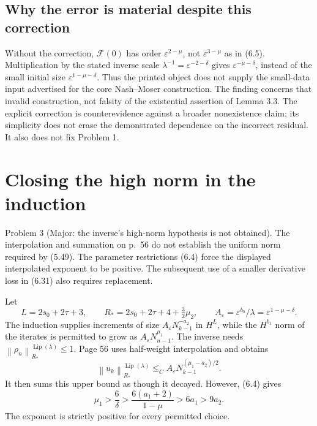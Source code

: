 \documentclass[10pt]{article}
\begin{document}
\subsection*{Why the error is material despite this correction}
Without the correction, \(\mathcal F(0)\) has order \(\varepsilon^{2-\mu}\), not \(\varepsilon^{3-\mu}\) as in (6.5). Multiplication by the stated inverse scale \(\lambda^{-1}=\varepsilon^{-2-\delta}\) gives \(\varepsilon^{-\mu-\delta}\), instead of the small initial size \(\varepsilon^{1-\mu-\delta}\). Thus the printed object does not supply the small-data input advertised for the core Nash–Moser construction. The finding concerns that invalid construction, not falsity of the existential assertion of Lemma 3.3. The explicit correction is counterevidence against a broader nonexistence claim; its simplicity does not erase the demonstrated dependence on the incorrect residual. It also does not fix Problem 1.\par
\section*{Closing the high norm in the induction}
Problem 3 (Major: the inverse’s high-norm hypothesis is not obtained).  The interpolation and summation on p. 56 do not establish the uniform norm required by (5.49). The parameter restrictions (6.4) force the displayed interpolated exponent to be positive. The subsequent use of a smaller derivative loss in (6.31) also requires replacement.\par
Let \[L=2s_0+2\tau+3,\qquad
 R_*=2s_0+2\tau+4+\tfrac32\mu_2,\qquad
 A_\varepsilon=\varepsilon^{b_0}/\lambda=\varepsilon^{1-\mu-\delta}.\] The induction supplies increments of size \(A_\varepsilon N_{k-1}^{-a_2}\) in \(H^L\), while the \(H^{b_1}\) norm of the iterates is permitted to grow as \(A_\varepsilon N_{n-1}^{\mu_1}\). The inverse needs \(\left\lVert \rho_n\right\rVert_{R_*}^{\operatorname{Lip}(\lambda)}\le1\). Page 56 uses half-weight interpolation and obtains \[\left\lVert u_k\right\rVert_{R_*}^{\operatorname{Lip}(\lambda)}
   \mathrel{\leq_C}A_\varepsilon N_{k-1}^{(\mu_1-a_2)/2}.\] It then sums this upper bound as though it decayed. However, (6.4) gives \[\mu_1>\frac6\delta>
       \frac{6(a_1+2)}{1-\mu}>6a_1>9a_2 .\] The exponent is strictly positive for every permitted choice.\par
\end{document}
